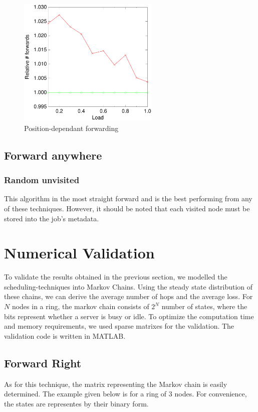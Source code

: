 \documentclass[10pt,a4paper,titlepage]{article}
\begin{document}
\begin{figure}[h!tb]
\centering
\includegraphics[width=0.6\textwidth]{data/evenswitchright.pdf}
\caption{Position-dependant forwarding}
\label{figevenswitch}
\end{figure}


\subsection{Forward anywhere}

\subsubsection{Random unvisited}
This algorithm in the most straight forward and is the best performing from any of these techniques. However, it should be noted that each visited node must be stored into the job's metadata.

\section{Numerical Validation}
To validate the results obtained in the previous section, we modelled the scheduling-techniques into Markov Chains. Using the steady state distribution of these chains, we can derive the average number of hops and the average loss. For $N$ nodes in a ring, the markov chain consists of $2^N$ number of states, where the bits represent whether a server is busy or idle. To optimize the computation time and memory requirements, we used sparse matrixes for the validation. The validation code is written in MATLAB.

\subsection{Forward Right}
\label{validateright}
As for this technique, the matrix representing the Markov chain is easily determined. The example given below is for a ring of 3 nodes. For convenience, the states are representes by their binary form.
\end{document}
